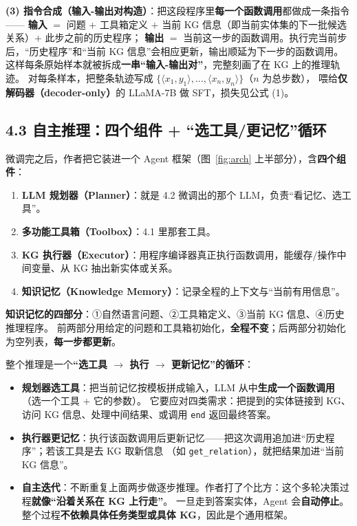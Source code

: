 \documentclass[11pt,UTF8,fontset=fandol]{ctexart}
\begin{document}
\textbf{(3) 指令合成（输入-输出对构造）}：把这段程序里\textbf{每一个函数调用}都做成一条指令——
\textbf{输入} $=$ 问题 $+$ 工具箱定义 $+$ 当前 KG 信息（即当前实体集的下一批候选关系）$+$ 此步之前的历史程序；
\textbf{输出} $=$ 当前这一步的函数调用。执行完当前步后，“历史程序”和“当前 KG 信息”会相应更新，输出顺延为下一步的函数调用。
这样每条原始样本就被拆成\textbf{一串“输入-输出对”}，完整刻画了在 KG 上的推理轨迹。
对每条样本，把整条轨迹写成 $\{\langle x_1,y_1\rangle,\dots,\langle x_n,y_n\rangle\}$（$n$ 为总步数），
喂给\textbf{仅解码器（decoder-only）}的 LLaMA-7B 做 SFT，损失见公式 (1)。

\subsection{4.3 自主推理：四个组件 + “选工具/更记忆”循环}

微调完之后，作者把它装进一个 Agent 框架（图~\ref{fig:arch} 上半部分），含\textbf{四个组件}：

\begin{enumerate}[leftmargin=2em]
  \item \textbf{LLM 规划器（Planner）}：就是 4.2 微调出的那个 LLM，负责“看记忆、选工具”。
  \item \textbf{多功能工具箱（Toolbox）}：4.1 里那套工具。
  \item \textbf{KG 执行器（Executor）}：用程序编译器真正执行函数调用，能缓存/操作中间变量、从 KG 抽出新实体或关系。
  \item \textbf{知识记忆（Knowledge Memory）}：记录全程的上下文与“当前有用信息”。
\end{enumerate}

\textbf{知识记忆的四部分}：①自然语言问题、②工具箱定义、③当前 KG 信息、④历史推理程序。
前两部分用给定的问题和工具箱初始化，\textbf{全程不变}；后两部分初始化为空列表，\textbf{每一步都更新}。

整个推理是一个\textbf{“选工具 $\to$ 执行 $\to$ 更新记忆”的循环}：

\begin{itemize}[leftmargin=2em]
  \item \textbf{规划器选工具}：把当前记忆按模板拼成输入，LLM 从中\textbf{生成一个函数调用}（选一个工具 + 它的参数）。
        它要应对四类需求：把提到的实体链接到 KG、访问 KG 信息、处理中间结果、或调用 \texttt{end} 返回最终答案。
  \item \textbf{执行器更记忆}：执行该函数调用后更新记忆——把这次调用追加进“历史程序”；若该工具是去 KG 取新信息
        （如 \texttt{get\_relation}），就把结果加进“当前 KG 信息”。
  \item \textbf{自主迭代}：不断重复上面两步做逐步推理。作者打了个比方：这个多轮决策过程\textbf{就像“沿着关系在 KG 上行走”}。
        一旦走到答案实体，Agent 会\textbf{自动停止}。整个过程\textbf{不依赖具体任务类型或具体 KG}，因此是个通用框架。
\end{itemize}
\end{document}
